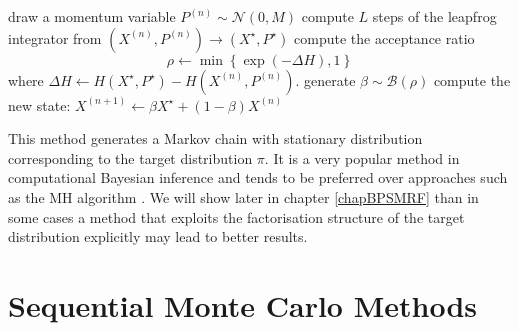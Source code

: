 \begin{algorithm}[!h]\small
	\caption{\label{alg:hmc-alg}}
	\begin{algorithmic}[1]
		\State draw a momentum variable $P^{(n)}\sim\mathcal N(0, M) $
		\State compute $L$ steps of the leapfrog integrator from $(X^{(n)},P^{(n)})\rightarrow (X^{\star},P^{\star})$ 
		\State compute the acceptance ratio
			$$ \rho \leftarrow \min\left\{\exp\left(-\Delta H \right),1\right\} $$
			where $\Delta H \leftarrow H(X^{\star},P^{\star})-H(X^{(n)}, P^{(n)})$.
		\State generate $\beta \sim\mathcal B(\rho)$
		\State compute the new state: $X^{(n+1)} \leftarrow \beta X^{\star}+(1-\beta)X^{(n)}$
	\end{algorithmic}
\end{algorithm}

This method generates a Markov chain with stationary distribution corresponding to the target distribution $\pi$. 
It is a very popular method in computational Bayesian inference and tends to be preferred over approaches such as the MH algorithm \citep{neal11}. We will show later in chapter \ref{chapBPSMRF} than in some cases a method that exploits the factorisation structure of the target distribution explicitly may lead to better results. 

\section{Sequential Monte Carlo Methods}
